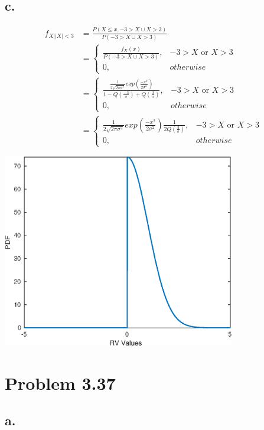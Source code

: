 \documentclass[12pt]{article}
\begin{document}
\subsection*{c.}
\begin{align*}
  f_{X||X|<3} &= \frac{P(X \leq x, -3>X \cup  X>3)}{P(-3>X \cup  X>3)} \\
  &= \begin{cases} 
    \frac{f_X(x)}{P(-3>X \cup  X>3)}, &  -3>X \textrm{ or } X>3\\
    0, & otherwise 
  \end{cases} \\
  &= \begin{cases} 
    \frac{\frac{1}{2\sqrt{2\pi\sigma^2}}exp(\frac{-x^2}{2\sigma^2})}
    {1- Q(\frac{-3}{\sigma}) + Q(\frac{3}{\sigma})}, & -3>X \textrm{ or } X>3 \\
    0, & otherwise 
  \end{cases} \\
  &= \begin{cases} 
    \frac{1}{2\sqrt{2\pi\sigma^2}}exp(\frac{-x^2}{2\sigma^2})
    \frac{1}{2Q(\frac{3}{\sigma})}, &  -3>X \textrm{ or } X>3 \\
    0, & otherwise 
  \end{cases}
\end{align*}

\includegraphics [width=4in]{fig_3_35_c.eps}

\section*{Problem 3.37}
\subsection*{a.}
\end{document}
